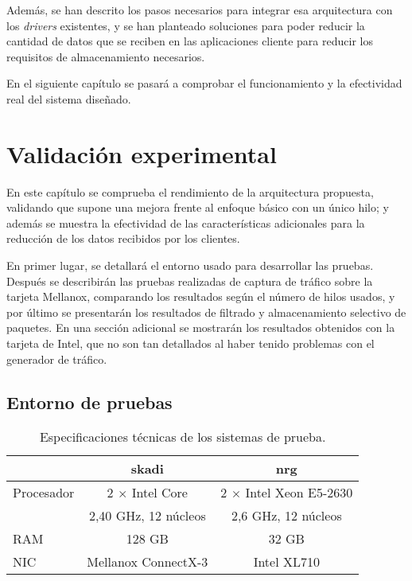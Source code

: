 \documentclass[twoside, 12pt, draft]{epstfg}
\begin{document}
Además, se han descrito los pasos necesarios para integrar esa arquitectura con los \textit{drivers} existentes, y se han planteado soluciones para poder reducir la cantidad de datos que se reciben en las aplicaciones cliente para reducir los requisitos de almacenamiento necesarios.

En el siguiente capítulo se pasará a comprobar el funcionamiento y la efectividad real del sistema diseñado.

\chapter{Validación experimental}
\label{chap:Validacion}

En este capítulo se comprueba el rendimiento de la arquitectura propuesta, validando que supone una mejora frente al enfoque básico con un único hilo; y además se muestra la efectividad de las características adicionales para la reducción de los datos recibidos por los clientes.

En primer lugar, se detallará el entorno usado para desarrollar las pruebas. Después se describirán las pruebas realizadas de captura de tráfico sobre la tarjeta Mellanox, comparando los resultados según el número de hilos usados, y por último se presentarán los resultados de filtrado y almacenamiento selectivo de paquetes. En una sección adicional se mostrarán los resultados obtenidos con la tarjeta de Intel, que no son tan detallados al haber tenido problemas con el generador de tráfico.

\section{Entorno de pruebas}

\begin{table}[hbtp]
\centering
\small
\begin{tabular}{lcc}
\toprule & \textbf{skadi} & \textbf{nrg} \\ \midrule
Procesador 	& 2 $\times$ Intel Core 	& 2 $\times$ Intel Xeon E5-2630  	\\
			& 2,40 GHz, 12 núcleos 		& 2,6 GHz, 12 núcleos  		\\
RAM 		& 128 GB 		& 32 GB 			\\
NIC 		& Mellanox ConnectX-3 & Intel XL710 \\ \bottomrule
\end{tabular}
\caption{Especificaciones técnicas de los sistemas de prueba.}
\label{tab:Validacion:Sistemas}
\end{table}
\end{document}
